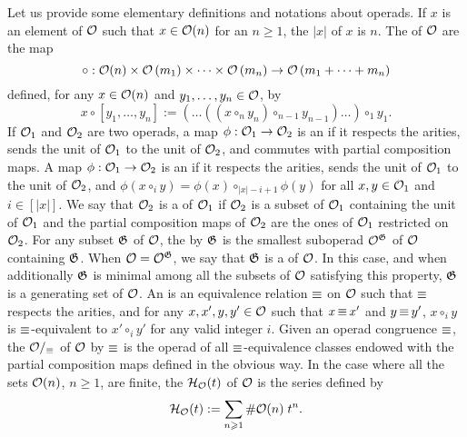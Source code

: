 Let us provide some elementary definitions and notations about operads.
If $x$ is an element of $\mathcal{O}$ such that $x \in \mathcal{O}(n)$ for an
$n \geq 1$, the  $|x|$ of $x$ is $n$. The
 of $\mathcal{O}$ are the map
\begin{equation}
    \circ : \mathcal{O}(n) \times
    \mathcal{O}\left(m_1\right) \times \dots \times \mathcal{O}\left(m_n\right)
    \to \mathcal{O}\left(m_1 + \dots + m_n\right)
\end{equation}
defined, for any $x \in \mathcal{O}(n)$ and $y_1, \dots, y_n \in \mathcal{O}$, by
\begin{equation} \label{equ:complete_composition}
    x \circ \left[y_1, \dots, y_n\right] :=
    \left(\dots \left(\left(x \circ_n y_n\right)
    \circ_{n - 1} y_{n - 1}\right) \dots\right) \circ_1 y_1.
\end{equation}
If $\mathcal{O}_1$ and $\mathcal{O}_2$ are two operads, a map
$\phi : \mathcal{O}_1 \to \mathcal{O}_2$ is an  if it respects
the arities, sends the unit of $\mathcal{O}_1$ to the unit of $\mathcal{O}_2$, and
commutes with partial composition maps. A map $\phi : \mathcal{O}_1 \to \mathcal{O}_2$
is an  if it respects the arities, sends the
unit of $\mathcal{O}_1$ to the unit of $\mathcal{O}_2$, and
\begin{math}
    \phi\left(x \circ_i y\right) = \phi(x) \circ_{|x|-i+1} \phi(y)
\end{math}
for all $x, y \in \mathcal{O}_1$ and $i \in [|x|]$. We say that $\mathcal{O}_2$ is a
 of $\mathcal{O}_1$ if $\mathcal{O}_2$ is a subset of $\mathcal{O}_1$
containing the unit of $\mathcal{O}_1$ and the partial composition maps of
$\mathcal{O}_2$ are the ones of $\mathcal{O}_1$ restricted on $\mathcal{O}_2$. For any subset
$\mathfrak{G}$ of $\mathcal{O}$, the  by
$\mathfrak{G}$ is the smallest suboperad $\mathcal{O}^{\mathfrak{G}}$ of
$\mathcal{O}$ containing $\mathfrak{G}$. When $\mathcal{O} = \mathcal{O}^{\mathfrak{G}}$,
we say that $\mathfrak{G}$ is a  of $\mathcal{O}$. In
this case, and when additionally $\mathfrak{G}$ is minimal among all
the subsets of $\mathcal{O}$ satisfying this property, $\mathfrak{G}$ is a
 generating set of $\mathcal{O}$. An  is an
equivalence relation $\operatorname{\equiv}$ on $\mathcal{O}$ such that $\operatorname{\equiv}$ respects the
arities, and for any $x, x', y, y' \in \mathcal{O}$ such that $x \operatorname{\equiv} x'$ and
$y \operatorname{\equiv} y'$, $x \circ_i y$ is $\operatorname{\equiv}$-equivalent to $x' \circ_i y'$
for any valid integer $i$. Given an operad congruence $\operatorname{\equiv}$, the
 $\mathcal{O}/_{\operatorname{\equiv}}$ of $\mathcal{O}$ by $\operatorname{\equiv}$ is the
operad of all $\operatorname{\equiv}$-equivalence classes endowed with the partial
composition maps defined in the obvious way. In the case where all the
sets $\mathcal{O}(n)$, $n \geq 1$, are finite, the 
$\mathcal{H}_{\mathcal{O}}(t)$ of $\mathcal{O}$ is the series defined by
\begin{equation} \label{equ:hilbert_series}
    \mathcal{H}_{\mathcal{O}}(t) := \sum_{n \geqslant 1} \# \mathcal{O}(n) \; t^n.
\end{equation}
\medbreak

